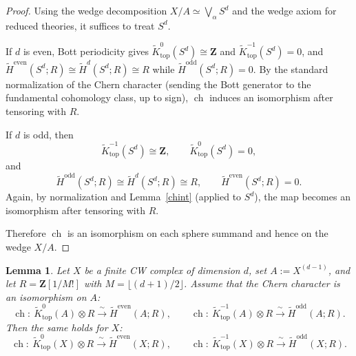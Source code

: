 \documentclass[11pt]{amsart}
\newtheorem{lemma}{Lemma}[section]
\numberwithin{equation}{section}
\newcommand{\ch}{{\operatorname{ch}}}
\newcommand{\topp}{{\operatorname{top}}}
\numberwithin{equation}{section}
\begin{document}
\begin{proof}
Using the wedge decomposition $X/A\simeq \bigvee_{\alpha} S^d$ and the wedge axiom for reduced theories, it suffices
to treat $S^d$.

If $d$ is even, Bott periodicity gives $\widetilde{K}_{\topp}^{0}(S^d)\cong \mathbf{Z}$ and $\widetilde{K}_{\topp}^{-1}(S^d)=0$,
and $\widetilde H^{\mathrm{even}}(S^d;R)\cong \widetilde H^{d}(S^d;R)\cong R$ while
$\widetilde H^{\mathrm{odd}}(S^d;R)=0$.
By the standard normalization of the Chern character (sending the Bott generator to the fundamental cohomology
class, up to sign), $\ch$ induces an isomorphism after tensoring with $R$.

If $d$ is odd, then
\[
\widetilde{K}_{\topp}^{-1}(S^d)\cong \mathbf{Z},
\qquad
\widetilde{K}_{\topp}^{0}(S^d)=0,
\]
and
\[
\widetilde H^{\mathrm{odd}}(S^d;R)\cong \widetilde H^{d}(S^d;R)\cong R,
\qquad
\widetilde H^{\mathrm{even}}(S^d;R)=0.
\]
Again, by normalization and Lemma~\ref{chint} (applied to $S^d$), the map becomes an
isomorphism after tensoring with $R$.

Therefore $\ch$ is an isomorphism on each sphere summand and hence on the wedge $X/A$.
\end{proof}


\begin{lemma}\label{fivech}
Let $X$ be a finite CW complex of dimension $d$, set $A:=X^{(d-1)}$, and let $R=\mathbf{Z}[1/M!]$ with
$M=\lfloor(d+1)/2\rfloor$.
Assume that the Chern character is an isomorphism on $A$:
\[
\ch:\ \widetilde{K}_{\topp}^{0}(A)\otimes R \xrightarrow{\ \sim\ } \widetilde H^{\mathrm{even}}(A;R),
\qquad
\ch:\ \widetilde{K}_{\topp}^{-1}(A)\otimes R \xrightarrow{\ \sim\ } \widetilde H^{\mathrm{odd}}(A;R).
\]
Then the same holds for $X$:
\[
\ch:\ \widetilde{K}_{\topp}^{0}(X)\otimes R \xrightarrow{\ \sim\ } \widetilde H^{\mathrm{even}}(X;R),
\qquad
\ch:\ \widetilde{K}_{\topp}^{-1}(X)\otimes R \xrightarrow{\ \sim\ } \widetilde H^{\mathrm{odd}}(X;R).
\]
\end{lemma}
\end{document}
